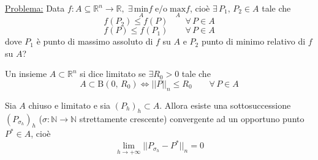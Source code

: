 \noindent \underline{Problema:} Data $f : A \subseteq \mathbb{R}^n \longrightarrow \mathbb{R}, \; \exists \, \underset{A}{\mathrm{min}}f \; \text{e/o} \; \underset{A}{\mathrm{max}}f$, cioè $\exists \, P_1,\,P_2 \in A$ tale che
$$
f(P_2) \leq f(P) \qquad \forall \, P \in A
$$
$$
f(P) \leq f(P_1) \qquad \forall \, P \in A
$$
dove $P_1$ è punto di massimo assoluto di $f$ su $A$ e $P_2$ punto di minimo relativo di $f$ su $A$?

\begin{definition}
Un insieme $A \subset \mathbb{R}^n$ si dice limitato se $\exists R_0 > 0$ tale che
$$
A \subset \mathrm{B}(0,\,R_0) \Longleftrightarrow ||P||_n \leq R_0 \qquad \forall \, P \in A
$$
\end{definition}

\begin{lemma}
Sia $A$ chiuso e limitato e sia $(P_h)_h \subset A$. Allora esiste una sottosuccessione $(P_{\sigma_h})_h$ ($\sigma : \mathbb{N} \longrightarrow \mathbb{N}$ strettamente crescente) convergente ad un opportuno punto $P^* \in A$, cioè
$$
\lim_{h \rightarrow +\infty} \lvert \lvert P_{\sigma_h} - P^* \lvert \lvert_n = 0
$$
\end{lemma}
